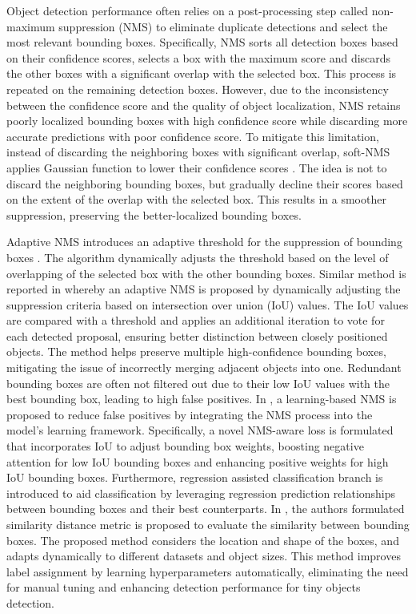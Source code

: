 \documentclass[preprint,12pt]{elsarticle}
\begin{document}
Object detection performance often relies on a post-processing step called non-maximum suppression (NMS) to eliminate duplicate detections and select the most relevant bounding boxes. Specifically, NMS sorts all detection boxes based on their confidence scores, selects a box with the maximum score and discards the other boxes with a significant overlap with the selected box. This process is repeated on the remaining detection boxes. However, due to the inconsistency between the confidence score and the quality of object localization, NMS retains poorly localized bounding boxes with high confidence score while discarding more accurate predictions with poor confidence score. To mitigate this limitation, instead of discarding the neighboring boxes with significant overlap, soft-NMS applies Gaussian function to lower their confidence scores \citep{bodla_soft-nmsimproving_2017}. The idea is not to discard the neighboring bounding boxes, but gradually decline their scores based on the extent of the overlap with the selected box. This results in a smoother suppression, preserving the better-localized bounding boxes. 

Adaptive NMS introduces an adaptive threshold for the suppression of bounding boxes \citep{liu_adaptive_2019}. The algorithm dynamically adjusts the threshold based on the level of overlapping of the selected box with the other bounding boxes. Similar method is reported in \citep{husham_al-badri_adaptive_2023} whereby an adaptive NMS is proposed by dynamically adjusting the suppression criteria based on intersection over union (IoU) values. The IoU values are compared with a threshold and applies an additional iteration to vote for each detected proposal, ensuring better distinction between closely positioned objects. The method helps preserve multiple high-confidence bounding boxes, mitigating the issue of incorrectly merging adjacent objects into one. Redundant bounding boxes are often not filtered out due to their low IoU values with the best bounding box, leading to high false positives. In \citep{jiang_non-maximum_2024}, a learning-based NMS is proposed to reduce false positives by integrating the NMS process into the model's learning framework. Specifically, a novel NMS-aware loss is formulated that incorporates IoU to adjust bounding box weights, boosting negative attention for low IoU bounding boxes and enhancing positive weights for high IoU bounding boxes. Furthermore, regression assisted classification branch is introduced to aid classification by leveraging regression prediction relationships between bounding boxes and their best counterparts. In \citep{shi_similarity_2024}, the authors formulated similarity distance metric is proposed to evaluate the similarity between bounding boxes. The proposed method considers the location and shape of the boxes, and adapts dynamically to different datasets and object sizes. This method improves label assignment by learning hyperparameters automatically, eliminating the need for manual tuning and enhancing detection performance for tiny objects detection.
\end{document}
